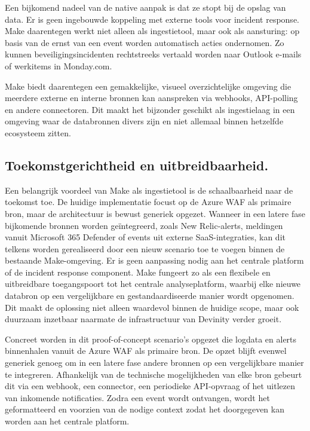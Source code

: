 Een bijkomend nadeel van de native aanpak is dat ze stopt bij de opslag van data. Er is geen ingebouwde koppeling met externe tools voor incident response. Make daarentegen werkt niet alleen als ingestietool, maar ook als aansturing: op basis van de ernst van een event worden automatisch acties ondernomen. Zo kunnen beveiligingsincidenten rechtstreeks vertaald worden naar Outlook e-mails of werkitems in Monday.com.

Make biedt daarentegen een gemakkelijke, visueel overzichtelijke omgeving die meerdere externe en interne bronnen kan aanspreken via webhooks, API-polling en andere connectoren. Dit maakt het bijzonder geschikt als ingestielaag in een omgeving waar de databronnen divers zijn en niet allemaal binnen hetzelfde ecosysteem zitten.

\subsection{Toekomstgerichtheid en uitbreidbaarheid.}
Een belangrijk voordeel van Make als ingestietool is de schaalbaarheid naar de toekomst toe. De huidige implementatie focust op de Azure WAF als primaire bron, maar de architectuur is bewust generiek opgezet. Wanneer in een latere fase bijkomende bronnen worden geïntegreerd, zoals New Relic-alerts, meldingen vanuit Microsoft 365 Defender of events uit externe SaaS-integraties, kan dit telkens worden gerealiseerd door een nieuw scenario toe te voegen binnen de bestaande Make-omgeving. Er is geen aanpassing nodig aan het centrale platform of de incident response component. Make fungeert zo als een flexibele en uitbreidbare toegangspoort tot het centrale analyseplatform, waarbij elke nieuwe databron op een vergelijkbare en gestandaardiseerde manier wordt opgenomen. Dit maakt de oplossing niet alleen waardevol binnen de huidige scope, maar ook duurzaam inzetbaar naarmate de infrastructuur van Devinity verder groeit.

Concreet worden in dit proof-of-concept scenario's opgezet die logdata en alerts binnenhalen vanuit de Azure WAF als primaire bron. De opzet blijft evenwel generiek genoeg om in een latere fase andere bronnen op een vergelijkbare manier te integreren. Afhankelijk van de technische mogelijkheden van elke bron gebeurt dit via een webhook, een connector, een periodieke API-opvraag of het uitlezen van inkomende notificaties. Zodra een event wordt ontvangen, wordt het geformatteerd en voorzien van de nodige context zodat het doorgegeven kan worden aan het centrale platform.

